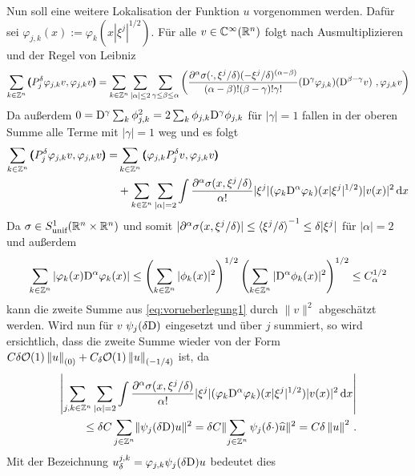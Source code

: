 Nun soll eine weitere Lokalisation der Funktion $u$ vorgenommen werden. Dafür sei $\varphi_{j,k}(x):=\varphi_k(x|\xi^j|^{1/2})$. Für alle $v\in\mathbb C^\infty(\mathbb R^n)$ folgt nach Ausmultiplizieren und der Regel von Leibniz
\begin{align*}
\sum_{k\in\Z^n}\spro {P^\delta_j\varphi_{j,k}v} {\varphi_{j,k}v} = \sum_{k\in\Z^n}\sum_{|\alpha|\le 2}\sum_{\gamma\le\beta\le\alpha} \left({\frac{\partial^\alpha\sigma(\cdot,\xi^j/\delta)(-\xi^j/\delta)^{(\alpha-\beta)}}{(\alpha-\beta)!(\beta-\gamma)!\gamma!}(\D^\gamma\varphi_{j,k})(\D^{\beta-\gamma}v)}\ , {\varphi_{j,k}v}\right)
\end{align*}
Da außerdem $0=\mathrm D^\gamma\sum_k\phi_{j,k}^2 = 2 \sum_k\phi_{j,k}\mathrm D^\gamma\phi_{j,k}$ für $|\gamma|=1$ fallen in der oberen Summe alle Terme mit $|\gamma|=1$ weg und es folgt
\begin{align}\label{eq:vorueberlegung1}
\sum_{k\in\mathbb Z^n}\pmb(P^\delta_j\varphi_{j,k}v,\varphi_{j,k}v\pmb) = &\sum_{k\in\mathbb Z^n}\pmb(\varphi_{j,k}P^\delta_jv,\varphi_{j,k}v\pmb) \\&+ \sum_{k\in\mathbb Z^n}\sum_{|\alpha|=2}\int \frac{\partial^\alpha\sigma(x,\xi^j/\delta)}{\alpha!} |\xi^j|(\varphi_k\mathrm D^\alpha\varphi_k)(x|\xi^j|^{1/2})|v(x)|^2\,\mathrm d x\nonumber
\end{align}
Da $\sigma\in S^1_\text{unif}(\mathbb R^n\times\mathbb R^n)$ und somit $|\partial^\alpha\sigma(x,\xi^j/\delta)|\le\braket{\xi^j/\delta}^{-1}\le \delta|\xi^j|$ für $|\alpha|=2$ und außerdem
\begin{align*}
\sum_{k\in\mathbb Z^n} |\varphi_k(x)\mathrm D^\alpha\varphi_k(x)|\le \left(\sum_{k\in\mathbb Z^n}|\phi_k(x)|^2\right)^{1/2}\left(\sum_{k\in\mathbb Z^n}|\mathrm D^\alpha\phi_k(x)|^2\right)^{1/2}\le C_\alpha^{1/2}
\end{align*}
kann die zweite Summe aus \eqref{eq:vorueberlegung1} durch $\|v\|^2$ abgeschätzt werden. Wird nun für $v$ $\psi_j(\delta\mathrm D)$ eingesetzt und über $j$ summiert, so wird ersichtlich, dass die zweite Summe wieder von der Form $C\delta \mathcal{O}(1) \left\lVert u\right\rVert_{(0)} + C_\delta \mathcal O(1)\left\lVert u\right\rVert_{(-1/4)}$ ist, da
\begin{align*}
\left|\sum_{j,k\in\mathbb Z^n}\sum_{|\alpha|=2}\int \frac{\partial^\alpha\sigma(x,\xi^j/\delta)}{\alpha!} |\xi^j|(\varphi_k\mathrm D^\alpha\varphi_k)(x|\xi^j|^{1/2})|v(x)|^2\,\mathrm d x\right|\\ \le \delta C \sum_{j\in\mathbb Z^n} \lVert\psi_j(\delta\mathrm D)u\rVert^2 = \delta C \lVert\sum_{j\in\mathbb Z^n} \psi_j(\delta \cdot)\widehat u\rVert^2 = C \delta \left\lVert u\right\rVert ^2\,.
\end{align*}
Mit der Bezeichnung $u_\delta^{j,k} = \varphi_{j,k} \psi_j(\delta\mathrm D)u$ bedeutet dies
